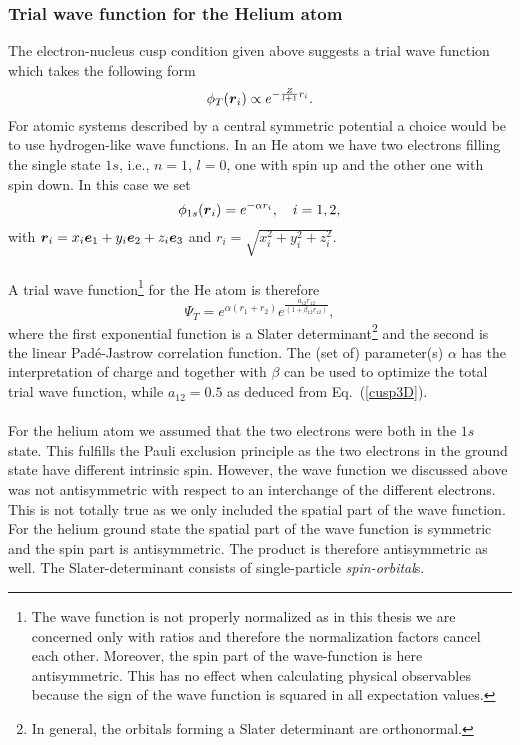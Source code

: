 \subsubsection{Trial wave function for the Helium atom}
The electron-nucleus cusp condition given above suggests a trial wave function which takes the following form  
$$\phi_T(\boldsymbol{r}_i) \propto e^{-\frac{Z}{l+1} r_i}.$$ 
For atomic systems described by a central symmetric potential a choice would be to use hydrogen-like wave functions. In an He atom we have two electrons filling the single state $1s$, i.e., $n=1$, $l=0$, one with spin up and the other one with spin down. In this case we set 
\begin{equation}\label{trial1s}
 \phi_{1s}(\boldsymbol{r}_i) = e^{-\alpha r_i}, \quad i = 1, 2,
\end{equation}
with $\boldsymbol{r}_i = x_i \boldsymbol{e}_1 + y_i \boldsymbol{e}_2 + z_i \boldsymbol{e}_3$ and $r_i = \sqrt{x_{i}^2 + y_{i}^2 + z_{i}^2}$.\\
\\
\noindent
A trial wave function\footnote{The wave function is not properly normalized as in this thesis we are concerned only with ratios and therefore the normalization factors cancel each other. Moreover, the spin part of the wave-function is here antisymmetric. This has no
effect when calculating physical observables because the sign of the
wave function is squared in all expectation values.}  for the He atom is therefore
\begin{equation}\label{trialHe}
\Psi_T = e^{\alpha(r_1 + r_2)}e^{\frac{a_{12} r_{12}}{(1 + \beta_{12} r_{12})}},
\end{equation}
where the first exponential function is a Slater determinant\footnote{In general, the orbitals forming a Slater determinant are orthonormal.} and the second is the linear Pad\'e-Jastrow correlation function. The (set of) parameter(s) $\alpha$ has the interpretation of charge and together with $\beta$ can be used to optimize the total trial wave function, while $a_{12} = 0.5$ as deduced from Eq.~(\ref{cusp3D}).\\
\\
\noindent
For the helium atom we assumed that
the two electrons were both in the $1s$ state. This fulfills the Pauli
exclusion principle as the two electrons in the ground state have
different intrinsic spin. However, the wave function we discussed above  
was not antisymmetric with
respect to an interchange of the different electrons. This is not totally 
true as we only included the spatial part of the wave function.
For the helium ground state the spatial part of the wave function is
symmetric and the spin part is antisymmetric. The product is
therefore antisymmetric as well. The Slater-determinant consists of
single-particle \emph{spin-orbital}s.


